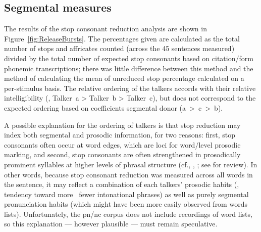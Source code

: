 \subsection{Segmental measures}
The results of the stop consonant reduction analysis are shown in Figure~\ref{fig:ReleaseBursts}.  The percentages given are calculated as the total number of stops and affricates counted (across the 45 sentences measured) divided by the total number of expected stop consonants based on citation\-/form phonemic transcriptions; there was little difference between this method and the method of calculating the mean of unreduced stop percentage calculated on a per-stimulus basis.  The relative ordering of the talkers accords with their relative intelligibility (\ie, Talker~\ac{a} > Talker~\ac{b} > Talker~\ac{c}), but does not correspond to the expected ordering based on coefficients segmental donor (\ac{a}~>~\ac{c}~>~\ac{b}).  

A possible explanation for the ordering of talkers is that stop reduction may index both segmental and prosodic information, for two reasons: first, stop consonants often occur at word edges, which are loci for word\-/level prosodic marking, and second, stop consonants are often strengthened in prosodically prominent syllables at higher levels of phrasal structure (cf., \eg, \citealt{deJong1995, FougeronKeating1997, ChoEtAl2007, ColeEtAl2007}; see \citealt{Keating2006} for review).  In other words, because stop consonant reduction was measured across all words in the sentence, it may reflect a combination of each talkers’ prosodic habits (\ie, tendency toward more \vs\ fewer intonational phrases) as well as purely segmental pronunciation habits (which might have been more easily observed from words lists).  Unfortunately, the \ac{pn/nc} corpus does not include recordings of word lists, so this explanation — however plausible — must remain speculative.

